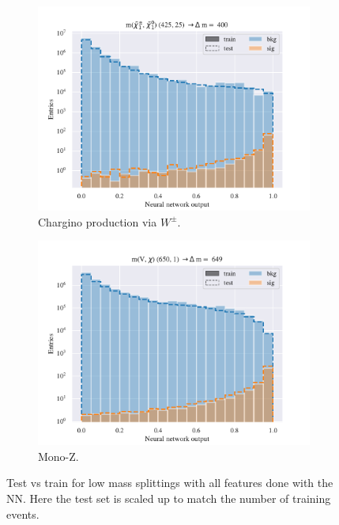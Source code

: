 \begin{figure}[H]
    \begin{subfigure}[t!]{0.49\textwidth}
        \includegraphics[width = \textwidth]{Figures/WW/NN/All_level/High/scaled_train_test_395330.pdf}
        \caption{Chargino production via $W^\pm$.}
        \label{fig:WWNNHigh}
    \end{subfigure}
    \begin{subfigure}[t!]{0.49\textwidth}
        \includegraphics[width = \textwidth]{Figures/Mono_Z/ML/NN/All_level/High/scaled_train_test_310617.pdf}
        \caption{Mono-Z.}
        \label{fig:MonoZNNHigh}
    \end{subfigure}
    \caption{Test vs train for low mass splittings with all features done with the NN. Here the test set is scaled up to match the number of training events.}
    \label{fig:AllHighNN}
\end{figure}


